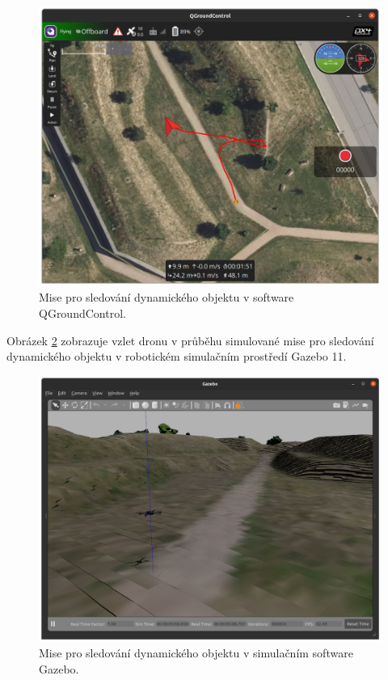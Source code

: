 \begin{figure}[!ht]
  \begin{center}
    \includegraphics[scale=0.40]{obrazky/MISESL1}
  \end{center}
  \caption[Mise pro sledování dynamického objektu v software QGroundControl]{Mise pro sledování dynamického objektu v software QGroundControl.}
  \label{fig:SIM3QGC}
\end{figure}

Obrázek \ref{fig:SIM3GAZ} zobrazuje vzlet dronu v průběhu simulované mise pro sledování dynamického objektu v robotickém simulačním prostředí Gazebo 11.

\begin{figure}[!ht]
  \begin{center}
    \includegraphics[scale=0.35]{obrazky/GAZSIMPLE.png}
  \end{center}
  \caption[Mise pro sledování dynamického objektu v simulačním software Gazebo]{Mise pro sledování dynamického objektu v simulačním software Gazebo.}
  \label{fig:SIM3GAZ}
\end{figure}


